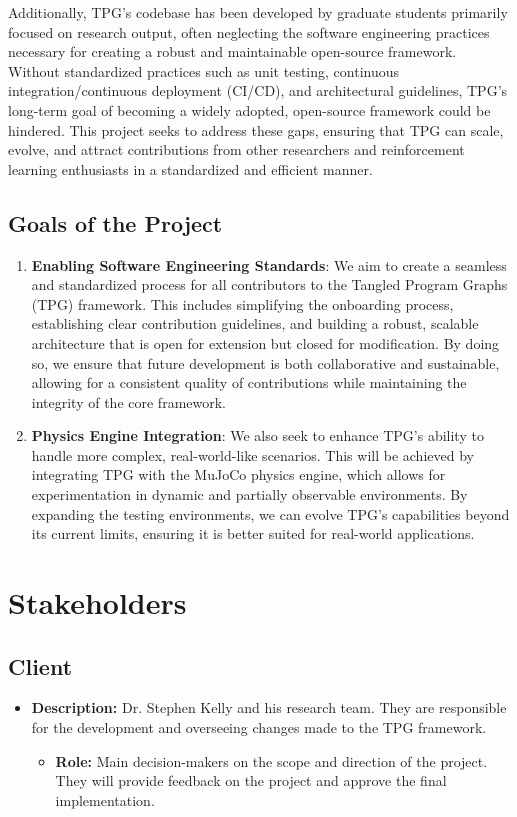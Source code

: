 \documentclass[12pt]{article}
\newcommand{\lips}{\textit{Insert your content here.}}
\begin{document}
Additionally, TPG's codebase has been developed by graduate students primarily focused on research output, often neglecting the software engineering practices necessary for creating a robust and maintainable open-source framework. Without standardized practices such as unit testing, continuous integration/continuous deployment (CI/CD), and architectural guidelines, TPG's long-term goal of becoming a widely adopted, open-source framework could be hindered. This project seeks to address these gaps, ensuring that TPG can scale, evolve, and attract contributions from other researchers and reinforcement learning enthusiasts in a standardized and efficient manner.
\subsection{Goals of the Project}

\begin{enumerate}
  \item \textbf{Enabling Software Engineering Standards}: We aim to create a seamless and standardized process for all contributors to the Tangled Program Graphs (TPG) framework. This includes simplifying the onboarding process, establishing clear contribution guidelines, and building a robust, scalable architecture that is open for extension but closed for modification. By doing so, we ensure that future development is both collaborative and sustainable, allowing for a consistent quality of contributions while maintaining the integrity of the core framework.
  \item \textbf{Physics Engine Integration}: We also seek to enhance TPG's ability to handle more complex, real-world-like scenarios. This will be achieved by integrating TPG with the MuJoCo physics engine, which allows for experimentation in dynamic and partially observable environments. By expanding the testing environments, we can evolve TPG's capabilities beyond its current limits, ensuring it is better suited for real-world applications.
\end{enumerate}

\section{Stakeholders}
\subsection{Client}
\begin{itemize}
  \item \textbf{Description:} Dr. Stephen Kelly and his research team. They are responsible for the development and overseeing changes made to the TPG framework.
    \begin{itemize}
      \item \textbf{Role:} Main decision-makers on the scope and direction of the project. They will provide feedback on the project and approve the final implementation.
    \end{itemize}

  \end{itemize}
\end{document}
